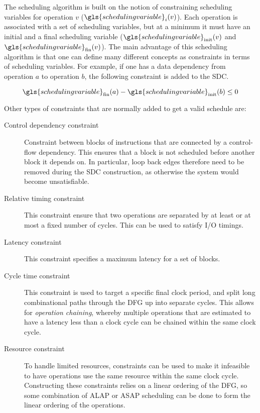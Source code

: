 The scheduling algorithm is built on the notion of constraining scheduling
variables for operation $v$ ($\gls{scheduling variable}_i(v)$).  Each operation
is associated with a set of scheduling variables, but at a minimum it must have
an initial and a final scheduling variable
($\gls{scheduling variable}_{\mathrm{init}}(v)$ and
$\gls{scheduling variable}_{\mathrm{fin}}(v)$).  The main advantage of this
scheduling algorithm is that one can define many different concepts as
constraints in terms of scheduling variables.  For example, if one has a data
dependency from operation $a$ to operation $b$, the following constraint is
added to the \gls{SDC}.

\begin{equation*}
  \gls{scheduling variable}_{\mathrm{fin}}(a) - \gls{scheduling
    variable}_{\mathrm{init}}(b) \leq 0
\end{equation*}

Other types of constraints that are normally added to get a valid schedule are:

\begin{description}
\item[Control dependency constraint] Constraint between blocks of instructions
  that are connected by a control-flow dependency.  This ensures that a block is
  not scheduled before another block it depends on.  In particular, loop back
  edges therefore need to be removed during the \gls{SDC} construction, as
  otherwise the system would become unsatisfiable.

\item[Relative timing constraint] This constraint ensure that two operations
  are separated by at least or at most a fixed number of cycles.  This can be
  used to satisfy I/O timings.

\item[Latency constraint] This constraint specifies a maximum latency for a set
  of blocks.

\item[Cycle time constraint] This constraint is used to target a specific final
  clock period, and split long combinational paths through the \gls{DFG} up into
  separate cycles.  This allows for \emph{\gls{operation chaining}}, whereby
  multiple operations that are estimated to have a latency less than a clock
  cycle can be chained within the same clock cycle.

\item[Resource constraint] To handle limited resources, constraints can be used
  to make it infeasible to have operations use the same resource within the same
  clock cycle.  Constructing these constraints relies on a linear ordering of
  the \gls{DFG}, so some combination of \gls{ALAP} or \gls{ASAP} scheduling can
  be done to form the linear ordering of the operations.
\end{description}

